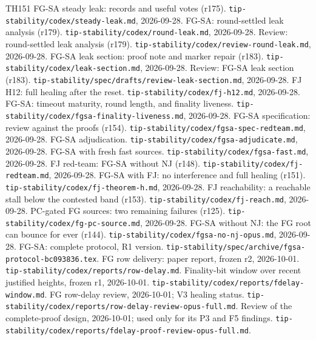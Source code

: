 \documentclass{article}
\theoremstyle{plain}
\theoremstyle{definition}
\theoremstyle{remark}
\begin{document}
\begin{thebibliography}{TH151}
  FG-SA steady leak: records and useful votes (r175).
  \nolinkurl{tip-stability/codex/steady-leak.md}, 2026-09-28.
  FG-SA: round-settled leak analysis (r179).
  \nolinkurl{tip-stability/codex/round-leak.md}, 2026-09-28.
  Review: round-settled leak analysis (r179).
  \nolinkurl{tip-stability/codex/review-round-leak.md}, 2026-09-28.
  FG-SA leak section: proof note and marker repair (r183).
  \nolinkurl{tip-stability/codex/leak-section.md}, 2026-09-28.
  Review: FG-SA leak section (r183).
  \nolinkurl{tip-stability/spec/drafts/review-leak-section.md}, 2026-09-28.
  FJ H12: full healing after the reset.
  \nolinkurl{tip-stability/codex/fj-h12.md}, 2026-09-28.
  FG-SA: timeout maturity, round length, and finality liveness.
  \nolinkurl{tip-stability/codex/fgsa-finality-liveness.md}, 2026-09-28.
  FG-SA specification: review against the proofs (r154).
  \nolinkurl{tip-stability/codex/fgsa-spec-redteam.md}, 2026-09-28.
  FG-SA adjudication.
  \nolinkurl{tip-stability/codex/fgsa-adjudicate.md}, 2026-09-28.
  FG-SA with fresh fast sources.
  \nolinkurl{tip-stability/codex/fgsa-fast.md}, 2026-09-28.
  FJ red-team: FG-SA without NJ (r148).
  \nolinkurl{tip-stability/codex/fj-redteam.md}, 2026-09-28.
  FG-SA with FJ: no interference and full healing (r151).
  \nolinkurl{tip-stability/codex/fj-theorem-h.md}, 2026-09-28.
  FJ reachability: a reachable stall below the contested band (r153).
  \nolinkurl{tip-stability/codex/fj-reach.md}, 2026-09-28.
  PC-gated FG sources: two remaining failures (r125).
  \nolinkurl{tip-stability/codex/fg-pc-source.md}, 2026-09-28.
  FG-SA without NJ: the FG root can bounce for ever (r144).
  \nolinkurl{tip-stability/codex/fgsa-no-nj-opus.md}, 2026-09-28.
  FG-SA: complete protocol, R1 version.
  \nolinkurl{tip-stability/spec/archive/fgsa-protocol-bc093836.tex}.
  FG row delivery: paper report, frozen r2, 2026-10-01.
  \nolinkurl{tip-stability/codex/reports/row-delay.md}.
  Finality-bit window over recent justified heights, frozen r1, 2026-10-01.
  \nolinkurl{tip-stability/codex/reports/fdelay-window.md}.
  FG row-delay review, 2026-10-01; V3 healing status.
  \nolinkurl{tip-stability/codex/reports/row-delay-review-opus-full.md}.
  Review of the complete-proof design, 2026-10-01;
  used only for its P3 and F5 findings.
  \nolinkurl{tip-stability/codex/reports/fdelay-proof-review-opus-full.md}.
\end{thebibliography}
\end{document}
